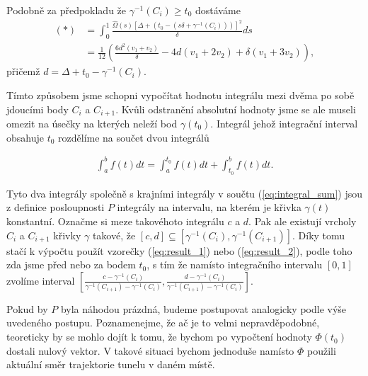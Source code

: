 Podobně za předpokladu že $ \gamma^{-1}(C_i) \geq t_0$ dostáváme
\begin{align}
    (*) &= \int_{0}^{1}
        \frac{\widehat{\Omega}(s)
            \left[\Delta + (t_0 - (s \delta + \gamma^{-1}(C_i)) ) \right]^2}
        {\delta}
         ds \\
    &= \frac{1}{12} \left(
        \frac{6 d^2 (v_1+v_2 )}{\delta}
        - 4 d (v_1+2 v_2 )
        + \delta (v_1+3 v_2 ) \right), \label{eq:result_2}
\end{align}
přičemž $ d = \Delta + t_0 - \gamma^{-1}(C_i) $.

Tímto způsobem jsme schopni vypočítat hodnotu integrálu mezi dvěma po sobě jdoucími
body $ C_i $ a $ C_{i + 1} $. Kvůli odstranění absolutní hodnoty jsme se ale
museli omezit na úsečky na kterých neleží bod $ \gamma(t_0) $. Integrál jehož
integrační interval obsahuje $ t_0 $ rozdělíme na součet dvou
integrálů

\begin{align*}
    \int_{a}^{b} f(t) dt = \int_{a}^{t_0} f(t) dt + \int_{t_0}^{b} f(t) dt.
\end{align*}

Tyto dva integrály společně s krajními integrály v součtu (\ref{eq:integral_sum})
jsou z definice posloupnosti $ P $ integrály na intervalu, na kterém je křivka
$ \gamma(t) $ konstantní. Označme si meze takovéhoto integrálu $ c $ a $ d $.
Pak ale existují vrcholy $ C_i $ a $ C_{i + 1} $ křivky $ \gamma $ takové, že
$ [c, d] \subseteq [\gamma^{-1}(C_i), \gamma^{-1}(C_{i + 1})] $. Díky tomu stačí
k výpočtu použít vzorečky (\ref{eq:result_1}) nebo (\ref{eq:result_2}), podle
toho zda jsme před nebo za bodem $ t_0 $, s tím že
namísto integračního intervalu $ [0, 1] $ zvolíme interval
$ \left[ \frac{c - \gamma^{-1}(C_i)}{\gamma^{-1}(C_{i + 1}) - \gamma^{-1}(C_i)},
 \frac{d - \gamma^{-1}(C_i)}{\gamma^{-1}(C_{i + 1}) - \gamma^{-1}(C_i)} \right] $.

Pokud by $ P $ byla náhodou prázdná, budeme postupovat
analogicky podle výše uvedeného postupu. Poznamenejme, že ač je to velmi
nepravděpodobné, teoreticky by se mohlo dojít k tomu, že bychom po vypočtení
hodnoty $ \Phi(t_0) $ dostali nulový vektor. V takové situaci bychom jednoduše
namísto $ \Phi $ použili aktuální směr trajektorie tunelu v daném místě.

